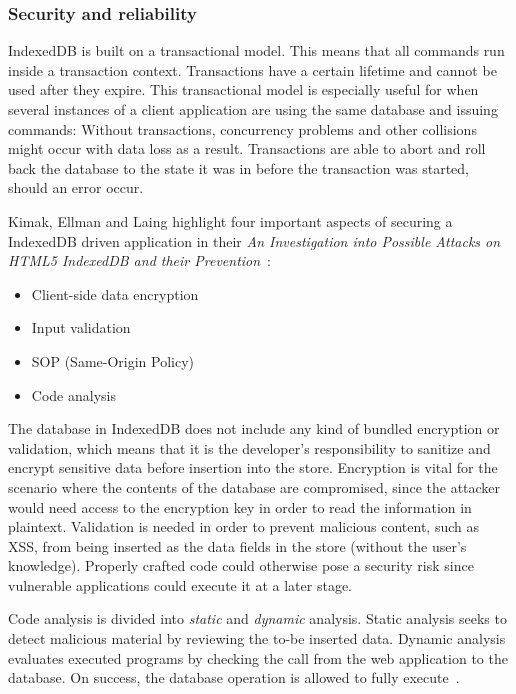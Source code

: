 \subsubsection{Security and reliability}
\label{subsec:security}
IndexedDB is built on a transactional model. This means that all commands run inside a transaction context. Transactions have a certain lifetime and cannot be used after they expire. This transactional model is especially useful for when several instances of a client application are using the same database and issuing commands: Without transactions, concurrency problems and other collisions might occur with data loss as a result. Transactions are able to abort and roll back the database to the state it was in before the transaction was started, should an error occur.

Kimak, Ellman and Laing highlight four important aspects of securing a IndexedDB driven application in their \emph{An Investigation into Possible Attacks on HTML5 IndexedDB and their Prevention}~\cite{IndexedDBSecurity:2012:Online}:

\begin{itemize}
  \item Client-side data encryption
  \item Input validation
  \item SOP (Same-Origin Policy)
  \item Code analysis
\end{itemize}

The database in IndexedDB does not include any kind of bundled encryption or validation, which means that it is the developer's responsibility to sanitize and encrypt sensitive data before insertion into the store. Encryption is vital for the scenario where the contents of the database are compromised, since the attacker would need access to the encryption key in order to read the information in plaintext. Validation is needed in order to prevent malicious content, such as XSS, from being inserted as the data fields in the store (without the user's knowledge). Properly crafted code could otherwise pose a security risk since vulnerable applications could execute it at a later stage.

Code analysis is divided into \emph{static} and \emph{dynamic} analysis. Static analysis seeks to detect malicious material by reviewing the to-be inserted data. Dynamic analysis evaluates executed programs by checking the call from the web application to the database. On success, the database operation is allowed to fully execute~\cite{IndexedDBSecurity:2012:Online}.

